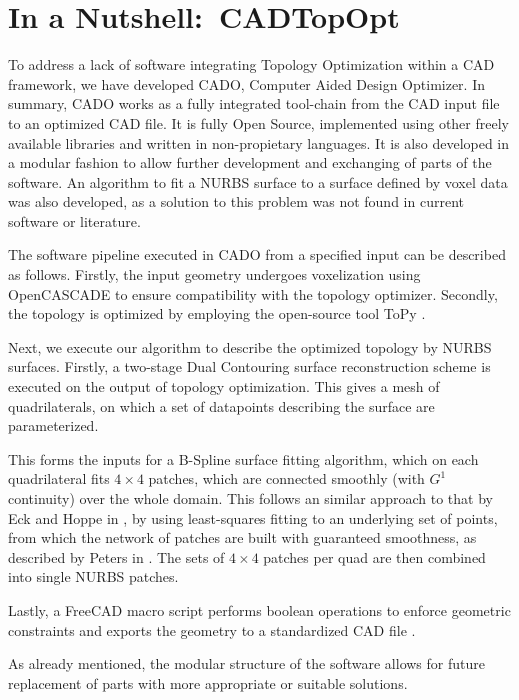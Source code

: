 \section{In a Nutshell:\ \acl{CADTopOpt}}
\label{sec:nutshell}
To address a lack of software integrating Topology Optimization within a CAD framework, we have developed CADO, Computer Aided Design Optimizer. In summary, CADO works as a fully integrated tool-chain from the CAD input file to an optimized CAD file. It is fully Open Source, implemented using other freely available libraries and written in non-propietary languages. It is also developed in a modular fashion to allow further development and exchanging of parts of the software. An algorithm to fit a NURBS surface to a surface defined by voxel data was also developed, as a solution to this problem was not found in current software or literature.

The software pipeline executed in CADO from a specified input can be described as follows. Firstly, the input geometry undergoes voxelization using OpenCASCADE to ensure compatibility with the topology optimizer. Secondly, the topology is optimized by employing the open-source tool ToPy \cite{ToPy}.  

Next, we execute our algorithm to describe the optimized topology by NURBS surfaces. Firstly, a two-stage Dual Contouring surface reconstruction scheme is executed on the output of topology optimization. This gives a mesh of quadrilaterals, on which a set of datapoints describing the surface are parameterized.

This forms the inputs for a B-Spline surface fitting algorithm, which on each quadrilateral fits $4 \times 4$ \Bez patches, which are connected smoothly (with $G^1$ continuity) over the whole domain. This follows an similar approach to that by Eck and Hoppe in \cite{eck1996automatic}, by using least-squares fitting to an underlying set of points, from which the network of \Bez patches are built with guaranteed smoothness, as described by Peters in \cite{peters1992constructing}. The sets of $4 \times 4$ \Bez patches per quad are then combined into single NURBS patches.

Lastly, a FreeCAD macro script performs boolean operations to enforce geometric constraints and exports the geometry to a standardized CAD file \cite{FreeCAD}.

As already mentioned, the modular structure of the software allows for future replacement of parts with more appropriate or suitable solutions. 

